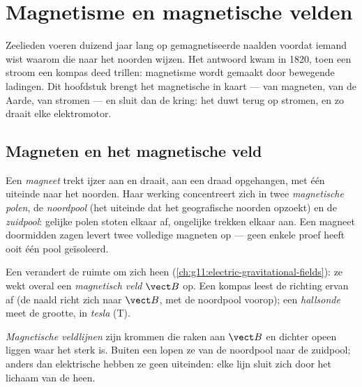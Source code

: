 \chapter{Magnetisme en magnetische velden}\label{ch:g11:magnetic-fields}

Zeelieden voeren duizend jaar lang op gemagnetiseerde naalden voordat
iemand wist waarom die naar het noorden wijzen. Het antwoord kwam in
1820, toen een stroom een kompas deed trillen: magnetisme wordt gemaakt
door bewegende ladingen. Dit hoofdstuk brengt het magnetische  in
kaart --- van magneten, van de Aarde, van stromen --- en sluit dan de
kring: het  duwt terug op stromen, en zo draait elke elektromotor.

\section{Magneten en het magnetische veld}

\begin{definition}\label{def:g11:magnetic-fields:magnet}
Een \emph{magneet} trekt ijzer aan en draait, aan een
draad opgehangen, met één uiteinde naar het noorden. Haar werking
concentreert zich in twee \emph{magnetische polen}, de \emph{noordpool} (het uiteinde dat het geografische noorden
opzoekt) en de \emph{zuidpool}: gelijke polen stoten elkaar af,
ongelijke trekken elkaar aan. Een magneet doormidden zagen levert twee
volledige magneten op --- geen enkele proef heeft ooit één pool
geïsoleerd.
\end{definition}

\begin{definition}\label{def:g11:magnetic-fields:bfield}
Een  verandert de ruimte om zich heen
(\cref{ch:g11:electric-gravitational-fields}): ze wekt overal een
\emph{magnetisch veld} $\vect B$ op. Een kompas
leest de richting ervan af (de naald richt zich naar $\vect B$, met de
noordpool voorop); een \emph{hallsonde} meet de grootte,
in \emph{tesla} (\unit{T}).
\end{definition}

\begin{definition}\label{def:g11:magnetic-fields:lines}
\emph{Magnetische veldlijnen} zijn krommen
die raken aan $\vect B$ en dichter opeen liggen waar het  sterk is.
Buiten een  lopen ze van de noordpool naar de zuidpool; anders dan
elektrische  hebben ze geen uiteinden: elke lijn sluit zich
door het lichaam van de  heen.
\end{definition}

